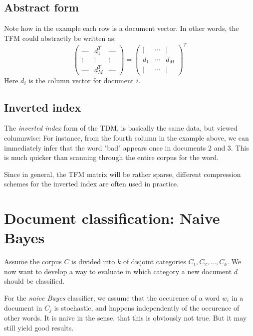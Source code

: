 \documentclass[12pt, a4paper]{article}
\numberwithin{equation}{section}
\begin{document}
\subsection{Abstract form}
Note how in the example each row is a document vector. In other words, the TFM could abstractly be written as:
\begin{equation}
\begin{pmatrix}
\textrm{---} & d_1^T & \textrm{---} \\
\vdots & \vdots & \vdots \\
\textrm{---} & d_M^T & \textrm{---}
\end{pmatrix}
=
\begin{pmatrix}
| & \cdots & | \\
d_1 & \cdots & d_M \\
| & \cdots & |
\end{pmatrix}^T
\end{equation}
Here $d_i$ is the column vector for document $i$.

\subsection{Inverted index}
The \textit{inverted index} form of the TDM, is basically the same data, but viewed columnwise: For instance, from the fourth column in the example above, we can immediately infer that the word "bad" appears once in documents 2 and 3. This is much quicker than scanning through the entire corpus for the word.

Since in general, the TFM matrix will be rather sparse, different compression schemes for the inverted index are often used in practice.

\section{Document classification: Naive Bayes}
Assume the corpus $C$ is divided into $k$ of disjoint categories $C_1, C_2,\ldots, C_k$. We now want to develop a way to evaluate in which category a new document $d$ should be classified.

For the \textit{naive Bayes} classifier, we assume that the occurence of a word $w_i$ in a document in $C_j$ is stochastic, and happens independently of the occurence of other words. It is naive in the sense, that this is obviously not true. But it may still yield good results.
\end{document}
